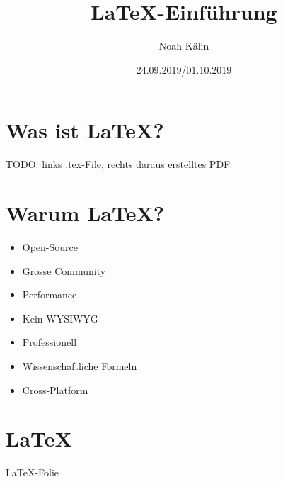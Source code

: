 \documentclass{beamer}
\title{\LaTeX-Einführung}
\author{Noah Kälin}
\date{24.09.2019/01.10.2019}
\begin{document}
\frame{\titlepage}

\section{Was ist \LaTeX?}
\begin{frame}
TODO: links .tex-File, rechts daraus erstelltes PDF
\end{frame}

\section{Warum \LaTeX?}
\begin{frame}
\begin{itemize}
	\item Open-Source
	\item Grosse Community
	\item Performance
	\item Kein WYSIWYG
	\item Professionell
	\item Wissenschaftliche Formeln
	\item Cross-Platform
\end{itemize}
\end{frame}





\section{\LaTeX}
\begin{frame}
\LaTeX-Folie
\end{frame}
\end{document}

